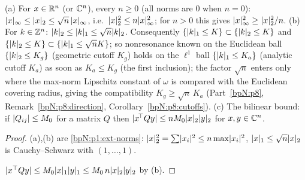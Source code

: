 \begin{lemma}\label{bpN:p1:norm-compare}
(a) For $x\in\mathbb{R}^n$ (or $\mathbb{C}^n$), every $n\ge0$ (all norms are $0$ when $n=0$): $\lvert x\rvert_\infty\le\lvert x\rvert_2\le\sqrt n\,\lvert x\rvert_\infty$, i.e.\ $\lvert x\rvert_2^2\le n\lvert x\rvert_\infty^2$; for $n>0$ this gives $\lvert x\rvert_\infty^2\ge\lvert x\rvert_2^2/n$. (b) For $k\in\mathbb{Z}^n$: $\lvert k\rvert_2\le\lvert k\rvert_1\le\sqrt n\lvert k\rvert_2$. Consequently $\{\lvert k\rvert_1\le K\}\subset\{\lvert k\rvert_2\le K\}$ and
$\{\lvert k\rvert_2\le K\}\subset\{\lvert k\rvert_1\le\sqrt nK\}$; so nonresonance known on the Euclidean ball $\{\lvert k\rvert_2\le K_g\}$ (geometric cutoff $K_g$) holds on the $\ell^1$ ball $\{\lvert k\rvert_1\le K_a\}$ (analytic cutoff $K_a$) as soon as $K_a\le K_g$ (the first inclusion); the factor $\sqrt n$ enters only where the max-norm Lipschitz constant of $\omega$ is compared with the Euclidean covering radius, giving the compatibility $K_g\ge\sqrt n\,K_a$ (Part~\ref{bpN:p8}, Remark~\ref{bpN:p8:direction}, Corollary~\ref{bpN:p8:cutoffs}). (c) The bilinear bound: if $\lvert Q_{ij}\rvert\le M_0$ for a matrix $Q$ then $\lvert x^{\!\top}Qy\rvert\le nM_0\lvert x\rvert_2\lvert y\rvert_2$ for $x,y\in\mathbb{C}^n$.
\end{lemma}
\begin{proof}
\label{stepN:p1:nc-vec} (a),(b) are \ref{bpN:p1:ext-norms}: $\lvert x\rvert_2^2=\sum\lvert x_i\rvert^2\le n\max\lvert x_i\rvert^2$, $\lvert x\rvert_1\le\sqrt n\lvert x\rvert_2$ is Cauchy--Schwarz with $(1,\dots,1)$.

\label{stepN:p1:nc-mat} $\lvert x^\top Qy\rvert\le M_0\lvert x\rvert_1\lvert y\rvert_1\le M_0\,n\lvert x\rvert_2\lvert y\rvert_2$ by (b).
\end{proof}

